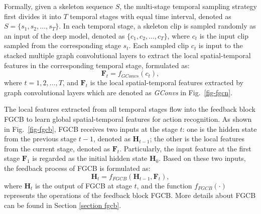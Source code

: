 \documentclass[runningheads]{llncs}
\begin{document}
Formally, given a skeleton sequence $S$, the multi-stage temporal sampling strategy first divides it into $T$ temporal stages with equal time interval, denoted as $S=\{s_1,s_2, \dots, s_T\}$. In each temporal stage, a skeleton clip is sampled randomly as an input of the deep model, denoted as $\{c_1,c_2, \dots, c_T\}$, where $c_t$ is the input clip sampled from the corresponding stage $s_t$. Each sampled clip $c_t$ is input to the stacked multiple graph convolutional layers to extract the local spatial-temporal features in the corresponding temporal stage, formulated as:
\begin{equation}
\textbf{F}_t=f_{GConvs}(c_t),
\end{equation}
where $t=1,2,\dots,T$, and $\textbf{F}_t$ is the local spatial-temporal features extracted by graph convolutional layers which are denoted as \textit{GConvs} in Fig.~\ref{fig-fgcn}.

The local features extracted from all temporal stages flow into the feedback block FGCB to learn global spatial-temporal features for action recognition. As shown in Fig.~\ref{fig-fgcb}, FGCB receives two inputs at the stage $t$: one is the hidden state from the previous stage $t-1$, denoted as $\textbf{H}_{t-1}$; the other is the local features from the current stage, denoted as $\textbf{F}_t$. Particularly, the input feature at the first stage $\textbf{F}_1$ is regarded as the initial hidden state $\textbf{H}_0$. Based on these two inputs, the feedback process of FGCB is formulated as:
\begin{equation}
\textbf{H}_t=f_{FGCB}(\textbf{H}_{t-1},\textbf{F}_t),
\end{equation}
where $\textbf{H}_t$ is the output of FGCB at stage $t$, and the function $f_{FGCB}(\cdot)$ represents the operations of the feedback block FGCB. More details about FGCB can be found in Section \ref{section fgcb}.
\end{document}
